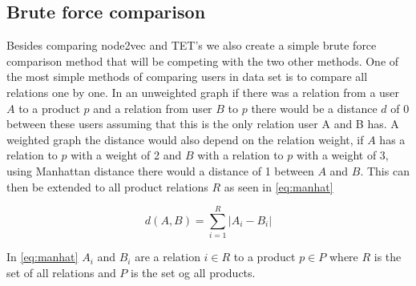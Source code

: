 \subsection{Brute force comparison}\label{Subsec:brute_force}
Besides comparing node2vec and TET's we also create a simple brute force comparison method that will be competing with the two other methods.
One of the most simple methods of comparing users in data set is to compare all relations one by one. 
In an unweighted graph if there was a relation from a user $A$ to a product $p$ and a relation from user $B$ to $p$ there would be a distance $d$ of 0 between these users assuming that this is the only relation user A and B has.
A weighted graph the distance would also depend on the relation weight, if $A$ has a relation to $p$ with a weight of 2 and $B$ with a relation to $p$ with a weight of 3, using Manhattan distance there would a distance of 1 between $A$ and $B$. 
This can then be extended to all product relations $R$ as seen in \autoref{eq:manhat}

\begin{equation}\label{eq:manhat}
	d(A,B) = \sum_{i=1}^{R} |A_i - B_i|
\end{equation}

In \autoref{eq:manhat} $A_i$ and $B_i$ are a relation $i \in R$ to a product $p \in P$ where $R$ is the set of all relations and $P$ is the set og all products.
